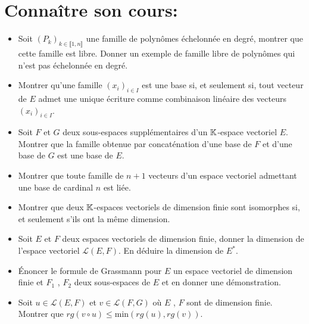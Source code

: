 \documentclass[a4paper,11pt]{article}
\theoremstyle{definition}
\begin{document}
 
 
 
 
	

\noindent{}

\smallskip
\section*{Connaître son cours:}
\begin{itemize}[$\bullet$]
	\item Soit $(P_k)_{k \in\llbracket 1,n\rrbracket} $ une famille de polynômes échelonnée en degré, montrer que cette famille est libre. Donner un exemple de famille libre de polynômes qui n'est pas échelonnée en degré. 
	\item Montrer qu'une famille $(x_i )_{i \in I}$ est une base si, et seulement si, tout vecteur de $E$ admet une unique écriture
	comme combinaison linéaire des vecteurs $(x_i )_{i \in I}$. 
	\item Soit $F$ et $G$ deux sous-espaces supplémentaires d’un $\mathbb{K}$-espace vectoriel $E$. Montrer que la famille obtenue par
	concaténation d'une base de $F$ et d’une base de $G$ est une base de $E $.
	\item Montrer que toute famille de $n + 1$ vecteurs d’un espace vectoriel admettant une base de cardinal $n$ est liée.
	\item Montrer que deux $\mathbb{K}$-espaces vectoriels de dimension finie sont isomorphes si, et seulement s’ils ont la même dimension.
	\item Soit $E$ et $F$ deux espaces vectoriels de dimension finie, donner la dimension de l'espace vectoriel $\mathcal L (E , F )$. En déduire la dimension de $E^*$.
	\item Énoncer le formule de Grassmann pour $E$ un espace vectoriel de dimension finie et $F_1$ , $F_2$ deux sous-espaces de $E$ et en donner une démonstration.
	\item Soit $u \in \mathcal L (E , F )$ et $v \in \mathcal L (F,G )$ où $E$ , $F$ sont de dimension finie. Montrer que $rg(v\circ u) \leq \text{min}(rg( u ), rg( v) )$.
\end{itemize}
\end{document}
